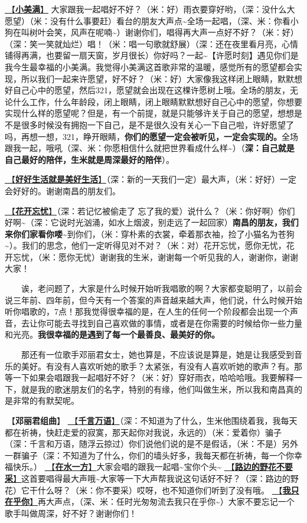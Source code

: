 \documentclass[]{ctexbook}
\begin{document}
\hyperref[happy-ending]{🎵【\textbf{小美满}】} 大家跟我一起唱好不好？（米：好）雨衣要穿好哟，（深：没什么大愿望）（米：没有什么事要赶）看台的朋友大声点\textasciitilde 全场一起唱，（深、米：你看小狗在叫树叶会笑，风声在呢喃\textasciitilde）谢谢你们，唱得再大声一点好不好？（米：好）（深：笑一笑就灿烂）唱！（米：唱一句歌就舒展）（深：还在夜里看月亮，心情铺得再满，也要留一扇天窗，岁月很长）你好吗？一起\textasciitilde【许愿时刻】遇见你们是我今生最幸福的小美满。我觉得小美满这首歌非常的温暖，感觉所有的愿望都会实现，所以我们一起来许愿望，好不好？（米：好）大家像我这样闭上眼睛，默默想好自己心中的愿望，然后321，愿望就会出现在这棵许愿树上哦。全场的朋友，无论什么工作，什么年龄段，闭上眼睛，闭上眼睛默默想好自己心中的愿望，你想要实现什么样的愿望呢？但是，有一个前提，就是只能够许关于自己的愿望，想想是不是很多时候没有拥抱一下自己，是不是很久没有关心一下自己啦，许好愿望了吗，再想一想，321，睁开眼睛，\textbf{你们的愿望一定会被听见，一定会实现的。}全场跟我一起，哦吼（深、米：你愿相信什么就把世界看成什么样\textasciitilde）（\textbf{深：自己就是自己最好的陪伴，生米就是周深最好的陪伴}）。

\hyperref[live-happy-life-happy]{🎵【\textbf{好好生活就是美好生活}】}（深：新的一天我们一定）最大声，（米：好好）一定会好好的。谢谢南昌的朋友们。

\hyperref[no-worries]{🎵【\textbf{花开忘忧}】}（深：若记忆被偷走了 忘了我的爱）说什么？（米：你好啊）你们好啊\textasciitilde（深：它说时光汹涌，如水上烟波，别走远了一起回家）\textbf{南昌的朋友，我们来你们家看你喽\textasciitilde{}}到你们，（米：穿朴素的衣裳，牵着那衣袖，捡了小猫名为苍狗\textasciitilde）。我们的思念，他们一定听得见对不对？（米：对）花开忘忧，愿你无忧，花开忘忧，（米：愿你无忧）谢谢我的生米，谢谢每一个听见我的人，谢谢你，谢谢大家！

  诶，老问题了，大家是什么时候开始听我唱歌的啊？大家都变聪明了，以前会说三年前、四年前，但今天有一个答案的声音越来越大声，他们说，什么时候开始听你唱歌的，7点！那我觉得很幸福的是，在人生的任何一个阶段都会出现一个声音，去让你可能去寻找到自己喜欢做的事情，或者是在你需要的时候给你一些力量和光亮。\textbf{我很幸福的是遇到了每一个最善良、最美好的你。}

  那还有一位歌手邓丽君女士，她也算是，不应该说是算是，她是让我感受到音乐的美好。有没有人喜欢听她的歌手？太紧张，有没有人喜欢听她的歌声？有。那等一下如果会唱跟我一起唱好不好？（米：好）穿好雨衣，哈哈哈哦。我要解释一下，就是我的歌迷朋友们的名字，特别的有缘，他们叫做生米，所以我和南昌真的是非常的有默契呢。

🎵【\textbf{邓丽君组曲}】
\hyperref[thousands-of-words]{🎵【\textbf{千言万语}】}（深：不知道为了什么，生米他围绕着我，我每天都在祈祷，快赶走爱的寂寞，那天起你对我说，永远的）（米：爱着你）骗子（深：千言和万语，随浮云掠过）你们说他们说的是不是假话，（米：不是）另外一群骗子（深：不知道为了什么，你们的墙头好多，我每天都在祈祷，每一个你幸福快乐。）
\hyperref[on-the-water-side]{🎵【\textbf{在水一方}】}大家会唱的跟我一起唱\textasciitilde 宝你个头\textasciitilde{}
\hyperref[only-with-me]{🎵【\textbf{路边的野花不要采}】}这首要唱得最大声哦\textasciitilde 大家等一下大声帮我说这句话好不好？（深：路边的野花）它干什么呀？（米：你不要采）哎呀，也不知道你们听到了没有哦。
\hyperref[only-you]{🎵【\textbf{我只在乎你}】}再大声点，（深、米：任时光匆匆流去我只在乎你\textasciitilde）大家不要忘记一个歌手叫做周深，好不好？谢谢你们！
\end{document}

